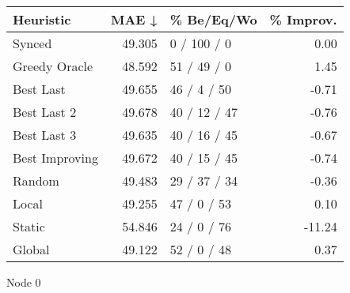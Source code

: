 \begin{tabular}{lrlr}
\toprule
\textbf{Heuristic} & \textbf{MAE ↓} & \textbf{\% Be/Eq/Wo} & \textbf{\% Improv.} \\
\midrule
            Synced &         49.305 &          0 / 100 / 0 &                0.00 \\
     Greedy Oracle &         48.592 &          51 / 49 / 0 &                1.45 \\
         Best Last &         49.655 &          46 / 4 / 50 &               -0.71 \\
       Best Last 2 &         49.678 &         40 / 12 / 47 &               -0.76 \\
       Best Last 3 &         49.635 &         40 / 16 / 45 &               -0.67 \\
    Best Improving &         49.672 &         40 / 15 / 45 &               -0.74 \\
            Random &         49.483 &         29 / 37 / 34 &               -0.36 \\
             Local &         49.255 &          47 / 0 / 53 &                0.10 \\
            Static &         54.846 &          24 / 0 / 76 &              -11.24 \\
            Global &         49.122 &          52 / 0 / 48 &                0.37 \\
\bottomrule
\end{tabular}
\caption{Node 0}
\label{tab:iid_lr05_le2_bs4_0}
